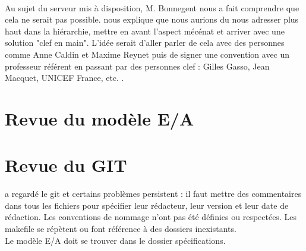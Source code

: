 \documentclass [a4paper] {article}
\begin{document}
\paragraph{}
Au sujet du serveur mis à disposition, M. Bonnegent nous a fait comprendre que cela ne serait pas possible. \nomTuteurPedago{} nous explique que nous aurions du nous adresser plus haut dans la hiérarchie, mettre en avant l'aspect mécénat et arriver avec une solution "clef en main". L'idée serait d'aller parler de cela avec des personnes comme Anne Caldin et Maxime Reynet puis de signer une convention avec un professeur référent en passant par des personnes clef : Gilles Gasso, Jean Macquet, UNICEF France, etc. .


\section{Revue du modèle E/A}



\section{Revue du GIT}
\nomTuteurPedago{} a regardé le git et certains problèmes persistent : il faut mettre des commentaires dans tous les fichiers pour spécifier leur rédacteur, leur version et leur date de rédaction. Les conventions de nommage n'ont pas été définies ou respectées. Les makefile se répètent ou font référence à des dossiers inexistants.
\\
Le modèle E/A doit se trouver dans le dossier spécifications.




\newpage
\end{document}
